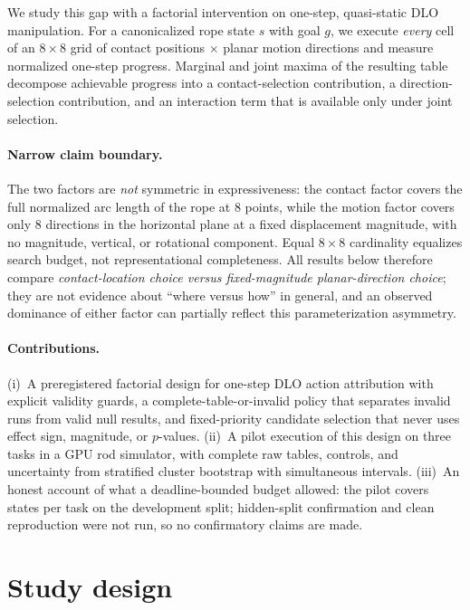 \documentclass{article}
\begin{document}
We study this gap with a factorial intervention on one-step, quasi-static DLO
manipulation. For a canonicalized rope state $s$ with goal $g$, we execute
\emph{every} cell of an $8{\times}8$ grid of contact positions $\times$ planar
motion directions and measure normalized one-step progress. Marginal and joint
maxima of the resulting table decompose achievable progress into a
contact-selection contribution, a direction-selection contribution, and an
interaction term that is available only under joint selection.

\paragraph{Narrow claim boundary.}
The two factors are \emph{not} symmetric in expressiveness: the contact factor
covers the full normalized arc length of the rope at 8 points, while the
motion factor covers only 8 directions in the horizontal plane at a fixed
displacement magnitude, with no magnitude, vertical, or rotational component.
Equal $8{\times}8$ cardinality equalizes search budget, not representational
completeness. All results below therefore compare \emph{contact-location
choice versus fixed-magnitude planar-direction choice}; they are not evidence
about ``where versus how'' in general, and an observed dominance of either
factor can partially reflect this parameterization asymmetry.

\paragraph{Contributions.}
(i)~A preregistered factorial design for one-step DLO action attribution with
explicit validity guards, a complete-table-or-invalid policy that separates
invalid runs from valid null results, and fixed-priority candidate selection
that never uses effect sign, magnitude, or $p$-values.
(ii)~A pilot execution of this design on three tasks in a GPU rod simulator,
with complete raw tables, controls, and uncertainty from stratified cluster
bootstrap with simultaneous intervals.
(iii)~An honest account of what a deadline-bounded budget allowed: the pilot
covers \nstatespertask{} states per task on the development split; hidden-split
confirmation and clean reproduction were not run, so no confirmatory claims
are made.

\section{Study design}
\end{document}
